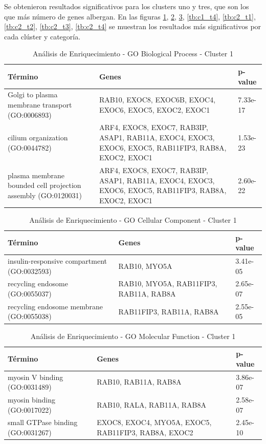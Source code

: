 Se obtenieron resultados significativos para los clusters uno y tres, que son los que más número de genes albergan. En las figuras \ref{tb:c1_t1}, \ref{tb:c1_t2}, \ref{tb:c1_t3}, \ref{tb:c1_t4}, \ref{tb:c2_t1}, \ref{tb:c2_t2}, \ref{tb:c2_t3}, \ref{tb:c2_t4} se muestran los resultados más significativos por cada clúster y categoría.
\begin{table}[H]
	\centering
	\caption{Análisis de Enriquecimiento - GO Biological Process - Cluster 1}
	\label{tb:c1_t1}
	\begin{tabular}{|p{4cm}|p{4cm}|p{3cm}|}
		\hline
		\textbf{Término} & \textbf{Genes} & \textbf{p-value} \\ \hline
		Golgi to plasma membrane transport (GO:0006893) & RAB10, EXOC8, EXOC6B, EXOC4, EXOC6, EXOC5, EXOC2, EXOC1 & 7.33e-17 \\ \hline
		cilium organization (GO:0044782) & ARF4, EXOC8, EXOC7, RAB3IP, ASAP1, RAB11A, EXOC4, EXOC3, EXOC6, EXOC5, RAB11FIP3, RAB8A, EXOC2, EXOC1 & 1.53e-23 \\ \hline
		plasma membrane bounded cell projection assembly (GO:0120031) & ARF4, EXOC8, EXOC7, RAB3IP, ASAP1, RAB11A, EXOC4, EXOC3, EXOC6, EXOC5, RAB11FIP3, RAB8A, EXOC2, EXOC1 & 2.60e-22 \\ \hline
	\end{tabular}
\end{table}

\begin{table}[H]
	\centering
	\caption{Análisis de Enriquecimiento - GO Cellular Component - Cluster 1}
	\label{tb:c1_t2}
	\begin{tabular}{|p{4cm}|p{4cm}|p{3cm}|}
		\hline
		\textbf{Término} & \textbf{Genes} & \textbf{p-value} \\ \hline
		insulin-responsive compartment (GO:0032593) & RAB10, MYO5A & 3.41e-05 \\ \hline
		recycling endosome (GO:0055037) & RAB10, MYO5A, RAB11FIP3, RAB11A, RAB8A & 2.65e-07 \\ \hline
		recycling endosome membrane (GO:0055038) & RAB11FIP3, RAB11A, RAB8A & 2.55e-05 \\ \hline
	\end{tabular}
\end{table}

\begin{table}[H]
	\centering
	\caption{Análisis de Enriquecimiento - GO Molecular Function - Cluster 1}
	\label{tb:c1_t3}
	\begin{tabular}{|p{4cm}|p{4cm}|p{3cm}|}
		\hline
		\textbf{Término} & \textbf{Genes} & \textbf{p-value} \\ \hline
		myosin V binding (GO:0031489) & RAB10, RAB11A, RAB8A & 3.86e-07 \\ \hline
		myosin binding (GO:0017022) & RAB10, RALA, RAB11A, RAB8A & 2.58e-07 \\ \hline
		small GTPase binding (GO:0031267) & EXOC8, EXOC4, MYO5A, EXOC5, RAB11FIP3, RAB8A, EXOC2 & 2.45e-10 \\ \hline
	\end{tabular}
\end{table}

